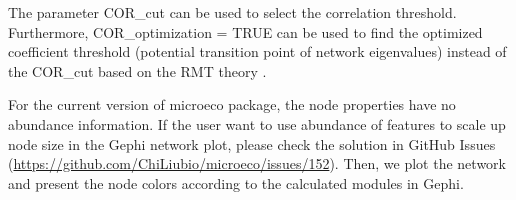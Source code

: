 \documentclass[
]{book}
\newenvironment{Shaded}{\begin{snugshade}}{\end{snugshade}}
\newcommand{\AttributeTok}[1]{\textcolor[rgb]{0.77,0.63,0.00}{#1}}
\newcommand{\CommentTok}[1]{\textcolor[rgb]{0.56,0.35,0.01}{\textit{#1}}}
\newcommand{\ConstantTok}[1]{\textcolor[rgb]{0.00,0.00,0.00}{#1}}
\newcommand{\FloatTok}[1]{\textcolor[rgb]{0.00,0.00,0.81}{#1}}
\newcommand{\FunctionTok}[1]{\textcolor[rgb]{0.00,0.00,0.00}{#1}}
\newcommand{\NormalTok}[1]{#1}
\newcommand{\SpecialCharTok}[1]{\textcolor[rgb]{0.00,0.00,0.00}{#1}}
\newcommand{\StringTok}[1]{\textcolor[rgb]{0.31,0.60,0.02}{#1}}
\begin{document}
The parameter COR\_cut can be used to select the correlation threshold.
Furthermore, COR\_optimization = TRUE can be used to find the optimized coefficient threshold (potential transition point of network eigenvalues)
instead of the COR\_cut based on the RMT theory \citep{Deng_Molecular_2012}.

\begin{Shaded}
\end{Shaded}

\begin{Shaded}
\end{Shaded}

\begin{Shaded}
\end{Shaded}

For the current version of microeco package, the node properties have no abundance information.
If the user want to use abundance of features to scale up node size in the Gephi network plot,
please check the solution in GitHub Issues (\url{https://github.com/ChiLiubio/microeco/issues/152}).
Then, we plot the network and present the node colors according to the calculated modules in Gephi.
\end{document}
